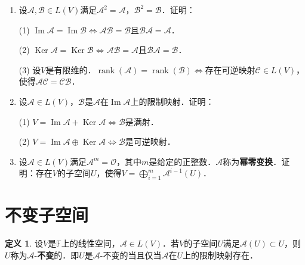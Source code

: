 \documentclass[a4paper,fontset=windows]{ctexbook}
\theoremstyle{definition}
\newtheorem{definition}{定义}[chapter]
\DeclareMathOperator{\im}{Im}
\DeclareMathOperator{\Ker}{Ker}
\DeclareMathOperator{\rank}{rank}
\DeclareMathOperator{\Span}{Span}
\begin{document}
\begin{enumerate}
\item 设$\mathcal{A,B}\in L(V)$满足$\mathcal{A}^2=\mathcal{A}$，$\mathcal{B}^2=\mathcal{B}$．证明：

(1) $\im\mathcal{A}=\im\mathcal{B}\Leftrightarrow\mathcal{AB=B}$且$\mathcal{BA=A}$．

(2) $\Ker\mathcal{A}=\Ker\mathcal{B}\Leftrightarrow\mathcal{AB=A}$且$\mathcal{BA=B}$．

(3) 设$V$是有限维的．$\rank(\mathcal{A})=\rank(\mathcal{B})\Leftrightarrow$存在可逆映射$\mathcal{C}\in L(V)$，使得$\mathcal{AC=CB}$．

\item 设$\mathcal{A}\in L(V)$，$\mathcal{B}$是$\mathcal{A}$在$\im\mathcal{A}$上的限制映射．证明：

(1) $V=\im\mathcal{A}+\Ker\mathcal{A}\Leftrightarrow\mathcal{B}$是满射．

(2) $V=\im\mathcal{A}\oplus\Ker\mathcal{A}\Leftrightarrow\mathcal{B}$是可逆映射．

\item 设$\mathcal{A}\in L(V)$满足$\mathcal{A}^m=\mathcal{O}$，其中$m$是给定的正整数．$\mathcal{A}$称为{\bf 幂零变换}．证明：存在$V$的子空间$U$，使得$V=\bigoplus\limits_{i=1}^m\mathcal{A}^{i-1}(U)$．

\end{enumerate}

\clearpage\section{不变子空间}

\begin{definition}
设$V$是$\mathbb{F}$上的线性空间，$\mathcal{A}\in L(V)$．若$V$的子空间$U$满足$\mathcal{A}(U)\subset U$，则$U$称为$\mathcal{A}$-{\bf 不变}的．即$U$是$\mathcal{A}$-不变的当且仅当$\mathcal{A}$在$U$上的限制映射存在．
\end{definition}
\end{document}
